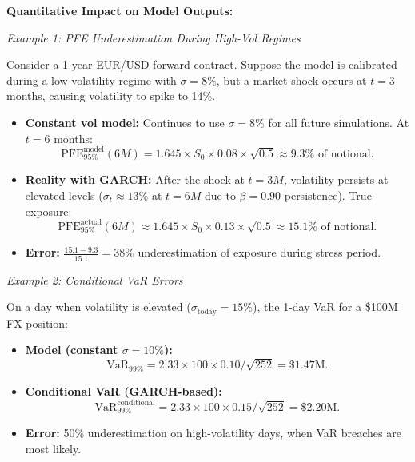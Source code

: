 \textbf{Quantitative Impact on Model Outputs:}

\textit{Example 1: PFE Underestimation During High-Vol Regimes}

Consider a 1-year EUR/USD forward contract. Suppose the model is calibrated during a low-volatility regime with $\sigma = 8\%$, but a market shock occurs at $t = 3$ months, causing volatility to spike to 14\%.

\begin{itemize}
	\item \textbf{Constant vol model:} Continues to use $\sigma = 8\%$ for all future simulations. At $t = 6$ months:
	\begin{equation}
		\text{PFE}_{95\%}^{\text{model}}(6M) = 1.645 \times S_0 \times 0.08 \times \sqrt{0.5} \approx 9.3\% \text{ of notional}.
	\end{equation}
	
	\item \textbf{Reality with GARCH:} After the shock at $t = 3M$, volatility persists at elevated levels ($\sigma_t \approx 13\%$ at $t = 6M$ due to $\beta = 0.90$ persistence). True exposure:
	\begin{equation}
		\text{PFE}_{95\%}^{\text{actual}}(6M) \approx 1.645 \times S_0 \times 0.13 \times \sqrt{0.5} \approx 15.1\% \text{ of notional}.
	\end{equation}
	
	\item \textbf{Error:} $\frac{15.1 - 9.3}{15.1} = 38\%$ underestimation of exposure during stress period.
\end{itemize}

\textit{Example 2: Conditional VaR Errors}

On a day when volatility is elevated ($\sigma_{\text{today}} = 15\%$), the 1-day VaR for a \$100M FX position:
\begin{itemize}
	\item \textbf{Model (constant $\sigma = 10\%$):} 
	\begin{equation}
		\text{VaR}_{99\%} = 2.33 \times 100 \times 0.10/\sqrt{252} = \$1.47\text{M}.
	\end{equation}
	
	\item \textbf{Conditional VaR (GARCH-based):}
	\begin{equation}
		\text{VaR}_{99\%}^{\text{conditional}} = 2.33 \times 100 \times 0.15/\sqrt{252} = \$2.20\text{M}.
	\end{equation}
	
	\item \textbf{Error:} 50\% underestimation on high-volatility days, when VaR breaches are most likely.
\end{itemize}

